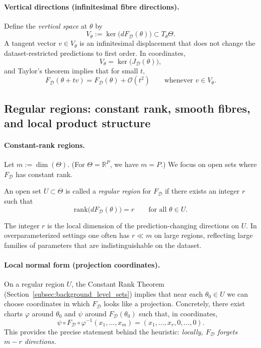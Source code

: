 \paragraph{Vertical directions (infinitesimal fibre directions).}
Define the \emph{vertical space} at $\theta$ by
\begin{equation}
V_\theta
:=\ker\!\bigl(dF_{\mathcal D}(\theta)\bigr)
\subset T_\theta\Theta.
\label{eq:vertical_space_def}
\end{equation}
A tangent vector $v\in V_\theta$ is an infinitesimal displacement that does not change
the dataset-restricted predictions to first order. In coordinates,
\[
V_\theta = \ker\!\bigl(J_{\mathcal D}(\theta)\bigr),
\]
and Taylor's theorem implies that for small $t$,
\[
F_{\mathcal D}(\theta+t v)=F_{\mathcal D}(\theta)+\mathcal O(t^2)
\qquad\text{whenever } v\in V_\theta.
\]

\subsection{Regular regions: constant rank, smooth fibres, and local product structure}
\label{subsec:regular_regions_constant_rank}


\paragraph{Constant-rank regions.}
Let $m:=\dim(\Theta)$. (For $\Theta=\mathbb R^P$, we have $m=P$.) We focus on open sets
where $F_{\mathcal D}$ has constant rank.

\begin{gdefn}
\label{def:regular_region}
An open set $U\subset\Theta$ is called a \emph{regular region} for $F_{\mathcal D}$ if there exists
an integer $r$ such that
\[
\mathrm{rank}\!\bigl(dF_{\mathcal D}(\theta)\bigr)=r
\qquad\text{for all }\theta\in U.
\]
\end{gdefn}

The integer $r$ is the local dimension of the prediction-changing directions on $U$.
In overparameterized settings one often has $r\ll m$ on large regions, reflecting large
families of parameters that are indistinguishable on the dataset.

\paragraph{Local normal form (projection coordinates).}
On a regular region $U$, the Constant Rank Theorem (Section~\ref{subsec:background_level_sets})
implies that near each $\theta_0\in U$ we can choose coordinates in which $F_{\mathcal D}$
looks like a projection. Concretely, there exist charts $\varphi$ around $\theta_0$ and $\psi$
around $F_{\mathcal D}(\theta_0)$ such that, in coordinates,
\[
\psi\circ F_{\mathcal D}\circ \varphi^{-1}(x_1,\dots,x_m)
=
(x_1,\dots,x_r,0,\dots,0).
\]
This provides the precise statement behind the heuristic:
\emph{locally, $F_{\mathcal D}$ forgets $m-r$ directions.}

